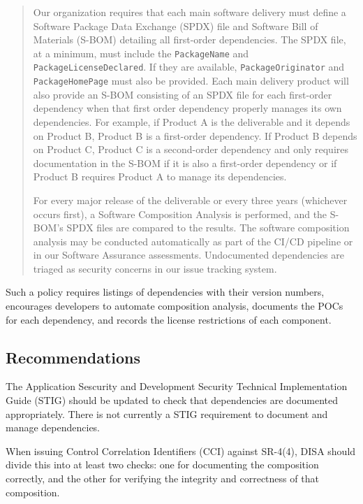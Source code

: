 \begin{quote}
Our organization requires that each main software delivery must define a Software Package Data Exchange (SPDX) file and Software Bill of Materials (S-BOM) detailing all first-order dependencies.\autocite{20210705:wheeler2019} The SPDX file, at a minimum, must include the \texttt{PackageName} and \texttt{PackageLicenseDeclared}. If they are available, \texttt{PackageOriginator} and \texttt{PackageHomePage} must also be provided. Each main delivery product will also provide an S-BOM consisting of an SPDX file for each first-order dependency when that first order dependency properly manages its own dependencies. For example, if Product A is the deliverable and it depends on Product B, Product B is a first-order dependency. If Product B depends on Product C, Product C is a second-order dependency and only requires documentation in the S-BOM if it is also a first-order dependency or if Product B requires Product A to manage its dependencies.

For every major release of the deliverable or every three years (whichever occurs first), a Software Composition Analysis is performed, and the S-BOM's SPDX files are compared to the results. The software composition analysis may be conducted automatically as part of the CI/CD pipeline or in our Software Assurance assessments. Undocumented dependencies are triaged as security concerns in our issue tracking system.
\end{quote}

Such a policy requires listings of dependencies with their version numbers, encourages developers to automate composition analysis, documents the POCs for each dependency, and records the license restrictions of each component.

\subsection{Recommendations}

The Application Sescurity and Development Security Technical Implementation Guide (STIG) should be updated to check that dependencies are documented appropriately. There is not currently a STIG requirement to document and manage dependencies.

When issuing Control Correlation Identifiers (CCI) against SR-4(4), DISA should divide this into at least two checks: one for documenting the composition correctly, and the other for verifying the integrity and correctness of that composition.
